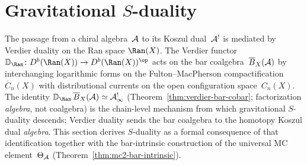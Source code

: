 
\section{Gravitational \texorpdfstring{$S$}{S}-duality}
\label{sec:thqg-gravitational-s-duality}

\providecommand{\Bbbk}{\mathbb{k}}
\providecommand{\HS}{\operatorname{HS}}
\providecommand{\wt}{\operatorname{wt}}
\providecommand{\CE}{\operatorname{CE}}
\providecommand{\End}{\operatorname{End}}
\providecommand{\Hom}{\operatorname{Hom}}
\providecommand{\Sym}{\operatorname{Sym}}
\providecommand{\id}{\mathrm{id}}
\providecommand{\Tr}{\operatorname{Tr}}
\providecommand{\Det}{\operatorname{Det}}
\providecommand{\Aut}{\operatorname{Aut}}
\providecommand{\Spec}{\operatorname{Spec}}
\providecommand{\Res}{\operatorname{Res}}
\providecommand{\rank}{\operatorname{rank}}
\providecommand{\ad}{\operatorname{ad}}
\providecommand{\Fred}{\operatorname{Fred}}
\providecommand{\VD}{\mathbb{D}}
\providecommand{\DS}{\mathrm{DS}}
\providecommand{\fib}{\operatorname{fib}}
\providecommand{\CoDer}{\operatorname{CoDer}}
\providecommand{\MC}{\mathrm{MC}}
\providecommand{\Defcyc}{\mathrm{Def}_{\mathrm{cyc}}}
\providecommand{\Sh}{\mathrm{Sh}}
\providecommand{\gr}{\operatorname{gr}}
\providecommand{\Map}{\operatorname{Map}}
\providecommand{\RGamma}{R\Gamma}
\providecommand{\Perf}{\operatorname{Perf}}
\providecommand{\RHom}{\operatorname{RHom}}
\providecommand{\HH}{\operatorname{HH}}
\providecommand{\Loc}{\operatorname{Loc}}

The passage from a chiral algebra~$\mathcal{A}$ to its Koszul dual~$\mathcal{A}^!$
is mediated by Verdier duality on the Ran space
$\Ran(X)$. The Verdier functor
$\VD_{\Ran}\colon D^b(\Ran(X)) \to D^b(\Ran(X))^{\op}$
acts on the bar coalgebra~$\overline{B}_X(\mathcal{A})$ by interchanging logarithmic
forms on the Fulton--MacPherson compactification~$\overline{C}_n(X)$
with distributional currents on the open configuration
space~$C_n(X)$. The identity
$\VD_{\Ran}\,\barB_X(\cA) \simeq \cA^!_\infty$
(Theorem~\ref{thm:verdier-bar-cobar}; factorization \emph{algebra},
not coalgebra) is the chain-level mechanism
from which gravitational $S$-duality descends: Verdier duality sends
the bar coalgebra to the homotopy Koszul dual \emph{algebra}.
This section derives
$S$-duality as a formal consequence of that identification together with
the bar-intrinsic construction of the universal MC
element~$\Theta_{\mathcal{A}}$ (Theorem~\ref{thm:mc2-bar-intrinsic}).

